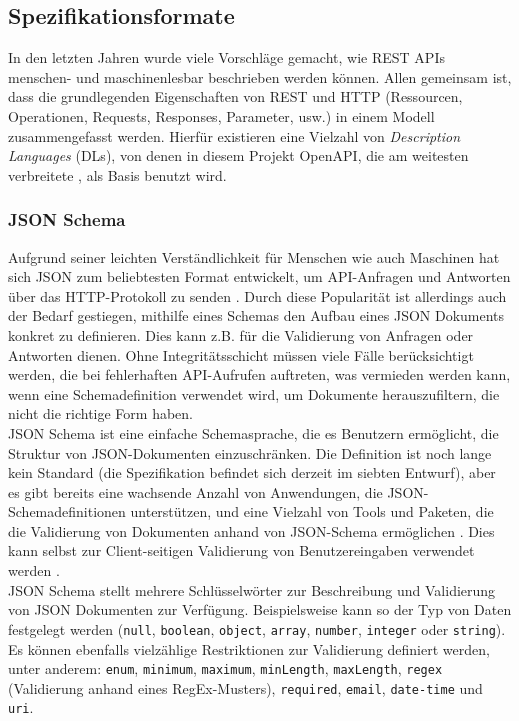 \subsection{Spezifikationsformate}

In den letzten Jahren wurde viele Vorschläge gemacht, wie REST APIs menschen- und maschinenlesbar beschrieben werden können. Allen gemeinsam ist, dass die grundlegenden Eigenschaften von REST und HTTP (Ressourcen, Operationen, Requests, Responses, Parameter, usw.) in einem Modell zusammengefasst werden. Hierfür existieren eine Vielzahl von \emph{Description Languages} (DLs), von denen in diesem Projekt OpenAPI, die am weitesten verbreitete \parencite[38]{scherer2016description}, als Basis benutzt wird.

\subsubsection{JSON Schema}

Aufgrund seiner leichten Verständlichkeit für Menschen wie auch Maschinen hat sich JSON zum beliebtesten Format entwickelt, um API-Anfragen und Antworten über das HTTP-Protokoll zu senden \parencite[263]{pezoa2016foundations}. Durch diese Popularität ist allerdings auch der Bedarf gestiegen, mithilfe eines Schemas den Aufbau eines JSON Dokuments konkret zu definieren. Dies kann z.B. für die Validierung von Anfragen oder Antworten dienen. Ohne Integritätsschicht müssen viele Fälle berücksichtigt werden, die bei fehlerhaften API-Aufrufen auftreten, was vermieden werden kann, wenn eine Schemadefinition verwendet wird, um Dokumente herauszufiltern, die nicht die richtige Form haben. \\

JSON Schema ist eine einfache Schemasprache, die es Benutzern ermöglicht, die Struktur von JSON-Dokumenten einzuschränken. Die Definition ist noch lange kein Standard (die Spezifikation befindet sich derzeit im siebten Entwurf), aber es gibt bereits eine wachsende Anzahl von Anwendungen, die JSON-Schemadefinitionen unterstützen, und eine Vielzahl von Tools und Paketen, die die Validierung von Dokumenten anhand von JSON-Schema ermöglichen \parencite[264]{pezoa2016foundations}. Dies kann selbst zur Client-seitigen Validierung von Benutzereingaben verwendet werden \parencite{sturgeon2018validation}. \\

JSON Schema stellt mehrere Schlüsselwörter zur Beschreibung und Validierung von JSON Dokumenten zur Verfügung. Beispielsweise kann so der Typ von Daten festgelegt werden (\lstinline|null|, \lstinline|boolean|, \lstinline|object|, \lstinline|array|, \lstinline|number|, \lstinline|integer| oder \lstinline|string|). Es können ebenfalls vielzählige Restriktionen zur Validierung definiert werden, unter anderem: \lstinline|enum|, \lstinline|minimum|, \lstinline|maximum|, \lstinline|minLength|, \lstinline|maxLength|, \lstinline|regex| (Validierung anhand eines RegEx-Musters), \lstinline|required|, \lstinline|email|, \lstinline|date-time| und \lstinline|uri|. \\

